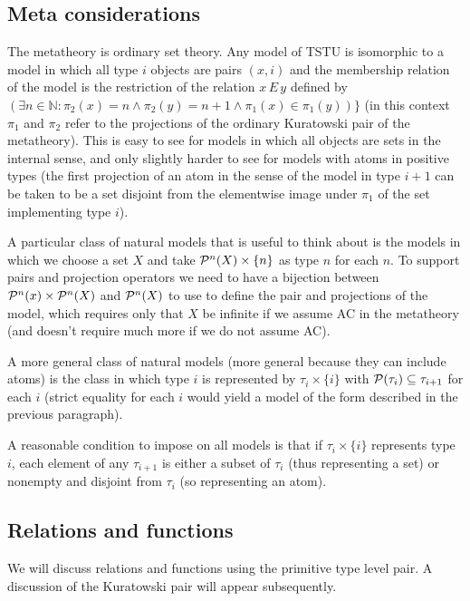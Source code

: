 \documentclass[12pt]{article}
\begin{document}
\subsection{Meta considerations}

The metatheory is ordinary set theory.  Any model of TSTU is isomorphic to a model in which all type $i$ objects are pairs $(x,i)$ and the membership relation of the model is the
restriction of the relation $x \, E\, y$ defined by $(\exists n \in {\mathbb N}:\pi_2(x) = n \wedge \pi_2(y) = n+1 \wedge \pi_1(x) \in \pi_1(y))\}$ (in this context $\pi_1$ and $\pi_2$ refer to the projections of the ordinary Kuratowski pair of the metatheory).  This is easy to see for models in which all objects are sets in the internal sense, and only slightly harder to see for models with atoms in positive types (the first projection of an atom in the sense of the model in type $i+1$ can be taken to be a set disjoint from the elementwise image under $\pi_1$ of the set implementing type $i$).

A particular class of natural models that is useful to think about is the models in which we choose a set $X$ and take ${\cal P}^n(X) \times \{n\}$ as type $n$ for each $n$.  To support pairs and projection operators we need to have a bijection between ${\cal P}^n(x) \times {\cal P}^n(X)$ and ${\cal P}^n(X)$ to use to define the pair and projections of the model, which requires only that $X$ be infinite if we assume AC in the metatheory (and doesn't require much more if we do not assume AC).

A more general class of natural models (more general because they can include atoms) is the class in which type $i$ is represented by $\tau_i \times \{i\}$ with ${\cal P}(\tau_i) \subseteq \tau_{i+1}$ for each $i$ (strict equality for each $i$ would yield a model of the form described in the previous paragraph).

A reasonable condition to impose on all models is that if $\tau_i \times \{i\}$ represents type $i$, each element of any $\tau_{i+1}$ is either a subset of $\tau_i$ (thus representing a set) or nonempty and disjoint from $\tau_i$ (so representing an atom).

\subsection{Relations and functions}

We will discuss relations and functions using the primitive type level pair.  A discussion of the Kuratowski pair will appear subsequently.
\end{document}
